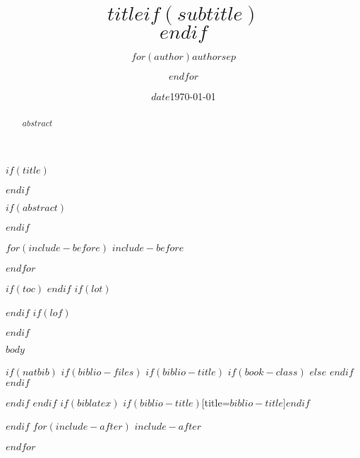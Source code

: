 \documentclass[$if(fontsize)$$fontsize$,$endif$$if(lang)$$lang$,$endif$$if(papersize)$$papersize$,$endif$$for(classoption)$$classoption$$sep$,$endfor$]{report}%
\title{\huge $title$$if(subtitle)$\\\vspace{0.5em}{\large $subtitle$}$endif$\vspace{3cm}}
\author{$for(author)$$author$$sep$ \and $endfor$}
\date{$date$}
\date{\today}
\begin{document}
$if(title)$
{\let\newpage\relax\maketitle}
$endif$

\renewcommand{\contentsname}{目\qquad 录}
\newpage
\tableofcontents
\thispagestyle{empty}
\newpage

$if(abstract)$
\begin{abstract}
$abstract$
\end{abstract}
$endif$

$for(include-before)$
$include-before$

$endfor$


$if(toc)$
{
\hypersetup{colorlinks=true,linktoc=all,linkcolor=black}
\setcounter{tocdepth}{$toc-depth$}
\tableofcontents
}
$endif$
$if(lot)$
\listoftables
$endif$
$if(lof)$
\listoffigures
$endif$

$body$

$if(natbib)$
$if(biblio-files)$
$if(biblio-title)$
$if(book-class)$
\renewcommand\bibname{$biblio-title$}
$else$
\renewcommand\refname{$biblio-title$}
$endif$
$endif$


$endif$
$endif$
$if(biblatex)$
\printbibliography$if(biblio-title)$[title=$biblio-title$]$endif$

$endif$
$for(include-after)$
$include-after$

$endfor$
\end{document}
